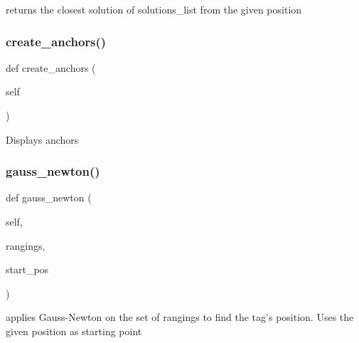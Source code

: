 \begin{DoxyVerb}returns the closest solution of solutions_list from the given position\end{DoxyVerb}
 \mbox{\label{classworld_1_1_world_afc14fa698ef83ef5c8e17a2ee98d1375}} 
\subsubsection{\texorpdfstring{create\+\_\+anchors()}{create\_anchors()}}
{\footnotesize\ttfamily def create\+\_\+anchors (\begin{DoxyParamCaption}\item[{}]{self }\end{DoxyParamCaption})}

\begin{DoxyVerb}Displays anchors\end{DoxyVerb}
 \mbox{\label{classworld_1_1_world_a9ee2b3e42f5d883afd028a9526c392d1}} 
\subsubsection{\texorpdfstring{gauss\+\_\+newton()}{gauss\_newton()}}
{\footnotesize\ttfamily def gauss\+\_\+newton (\begin{DoxyParamCaption}\item[{}]{self,  }\item[{}]{rangings,  }\item[{}]{start\+\_\+pos }\end{DoxyParamCaption})}

\begin{DoxyVerb}applies Gauss-Newton on the set of rangings to find the tag's position. Uses the given position as starting point\end{DoxyVerb}
 \mbox{\label{classworld_1_1_world_a660f28d74c53fc654edf9e0d60c68d45}} 

